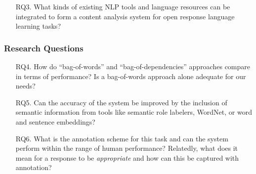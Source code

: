 \documentclass[handout,xcolor={dvipsnames}]{beamer}
\begin{document}
\begin{frame}
\begin{itemize}
\pause
\vspace{2em}
\item[RQ3.]{What kinds of existing NLP tools and language resources can be integrated to form a content analysis system for open response language learning tasks?}
\end{itemize}
\end{frame}

\begin{frame}
\frametitle{Research Questions}
\small
\begin{itemize}
\pause
\item[RQ4.]{How do ``bag-of-words'' and ``bag-of-dependencies'' approaches compare in terms of performance? Is a bag-of-words approach alone adequate for our needs?}
\pause
\vspace{2em}
\item[RQ5.]{Can the accuracy of the system be improved by the inclusion of semantic information from tools like semantic role labelers, WordNet, or word and sentence embeddings?}

\pause
\vspace{2em}
\item[RQ6.]{What is the annotation scheme for this task and can the system perform within the range of human performance? Relatedly, what does it mean for a response to be \textit{appropriate} and how can this be captured with annotation?}
\end{itemize}
\end{frame}
\end{document}
